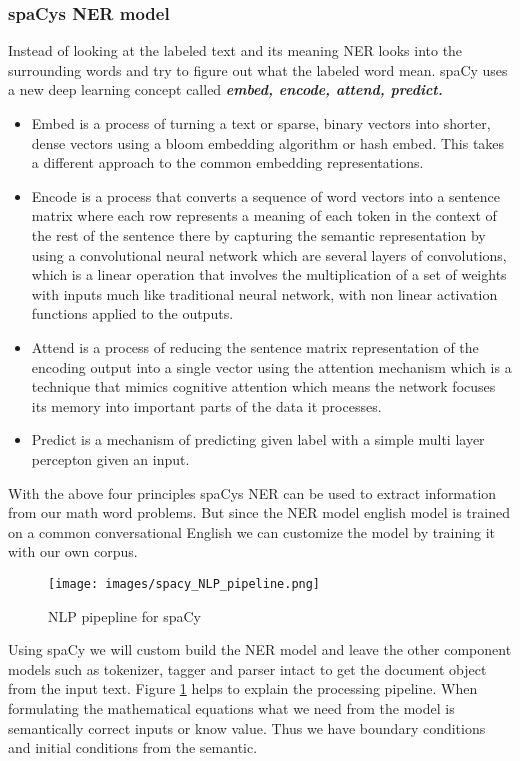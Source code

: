 \subsubsection{spaCys NER model} 
Instead of looking at the labeled text and its meaning NER looks into the surrounding words and try to figure out what the labeled word mean. spaCy uses a new deep learning concept called \textbf{\textit{embed, encode, attend, predict.}}

\begin{itemize}
    \item Embed is a process of turning a text or sparse, binary vectors into shorter, dense vectors using a bloom embedding algorithm or hash embed. This takes a different approach to the common embedding representations.
    \item Encode is a process that converts a sequence of word vectors into a sentence matrix where each row represents a meaning of each token in the context of the rest of the sentence there by capturing the semantic representation by using a convolutional neural network which are several layers of convolutions, which is a linear operation that involves the multiplication of a set of weights with inputs much like traditional neural network, with non linear activation functions applied to the outputs.
    \item Attend is a process of reducing the sentence matrix representation of the encoding output into a single vector using the attention mechanism which is a technique that mimics cognitive attention which means the network focuses its memory into important parts of the data it processes. 
    \item Predict is a mechanism of predicting given label with a simple multi layer percepton given an input.
    
\end{itemize}
With the above four principles spaCys NER can be used to extract information from our math word problems. But since the NER model english model is trained on a common conversational English we can customize the model by training it with our own corpus. 
\begin{figure}[h]
    \centering
\texttt{[image: images/spacy\_NLP\_pipeline.png]}
    \caption{NLP pipepline for spaCy}
    \label{fig:NLP pipelinel}
\end{figure} 
Using spaCy we will custom build the NER model and leave the other component models such as tokenizer, tagger and parser intact to get the document object from the input text. Figure \ref{fig:NLP pipelinel} helps to explain the processing pipeline.
When formulating the mathematical equations what we need from the model is semantically correct inputs or know value. Thus we have boundary conditions and initial conditions from the semantic.

